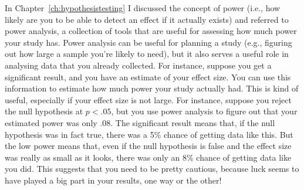 \begin{itemize}
 In Chapter~\ref{ch:hypothesistesting} I discussed the concept of power (i.e., how likely are you to be able to detect an effect if it actually exists) and referred to power analysis, a collection of tools that are useful for assessing how much power your study has. Power analysis can be useful for planning a study (e.g., figuring out how large a sample you're likely to need), but it also serves a useful role in analysing data that you already collected. For instance, suppose you get a significant result, and you have an estimate of your effect size. You can use this information to estimate how much power your study actually had. This is kind of useful, especially if your effect size is not large. For instance, suppose you reject the null hypothesis at $p<.05$, but you use power analysis to figure out that your estimated power was only $.08$. The significant result means that, if the null hypothesis was in fact true, there was a 5\% chance of getting data like this. But the low power means that, even if the null hypothesis is false and the effect size was really as small as it looks, there was only an 8\% chance of getting data like you did. This suggests that you need to be pretty cautious, because luck seems to have played a big part in your results, one way or the other!


\end{itemize}
